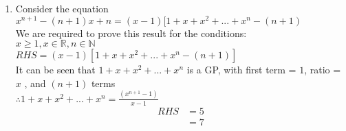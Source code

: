 \documentclass[a4paper]{article}
\begin{document}
\begin{enumerate}[label=(\alph*)]

\item Consider the equation\\

$x^{n+1}-(n+1)x+n = (x-1)[1+x+x^2+...+x^n-(n+1)$\\
We are required to prove this result for the conditions:\\

$x\geq1, x\in\mathbb{R}, n\in\mathbb{N}$\\


$RHS = (x-1)[1+x+x^2+...+x^n-(n+1)]$\\

It can be seen that $1+x+x^2+...+x^n$ is a GP, with first term = $1$, ratio = $x$ , and $(n+1)$ terms\\

$\therefore 1+x+x^2+...+x^n = \frac{(x^{n+1}-1)}{x-1}$\\

\begin{align*}
RHS &= 5\\
&= 7\\
\end{align*}













\end{enumerate}
\end{document}
